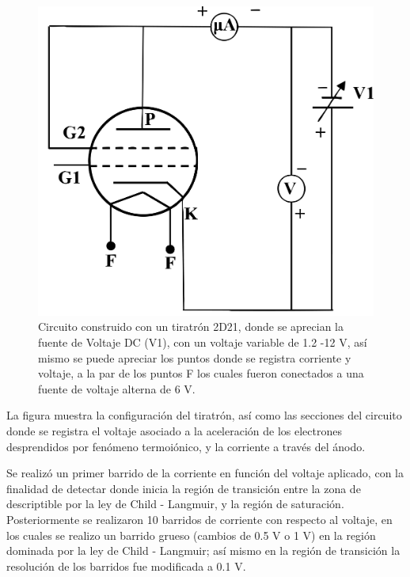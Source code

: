 
\begin{figure}[h!]
	\centering
	\includegraphics[width=\columnwidth]{img/circuitopot.png}
	\caption{Circuito construido con un tiratrón 2D21, donde se aprecian la fuente de Voltaje DC (V1), con un voltaje variable de 1.2 -12 V, así mismo se puede apreciar los puntos donde se registra corriente y voltaje, a la par de los puntos F los cuales fueron conectados a una fuente de voltaje alterna de 6 V.}
	\label{fig:circuit}
\end{figure}

La figura \ut{\ref{fig:circuit}} muestra la configuración del tiratrón, así como las secciones del circuito donde se registra el voltaje asociado a la aceleración de los electrones desprendidos por fenómeno termoiónico, y la corriente a través del ánodo.

Se realizó un primer barrido de la corriente en función del voltaje aplicado, con la finalidad de detectar donde inicia la región de transición entre la zona de descriptible por la ley de Child - Langmuir, y la región de saturación. Posteriormente se realizaron 10 barridos de corriente con respecto al voltaje, en los cuales se realizo un barrido grueso (cambios de 0.5 V o 1 V) en la región dominada por la ley de Child - Langmuir; así mismo en la región de transición la resolución de los barridos fue modificada a 0.1 V. 

